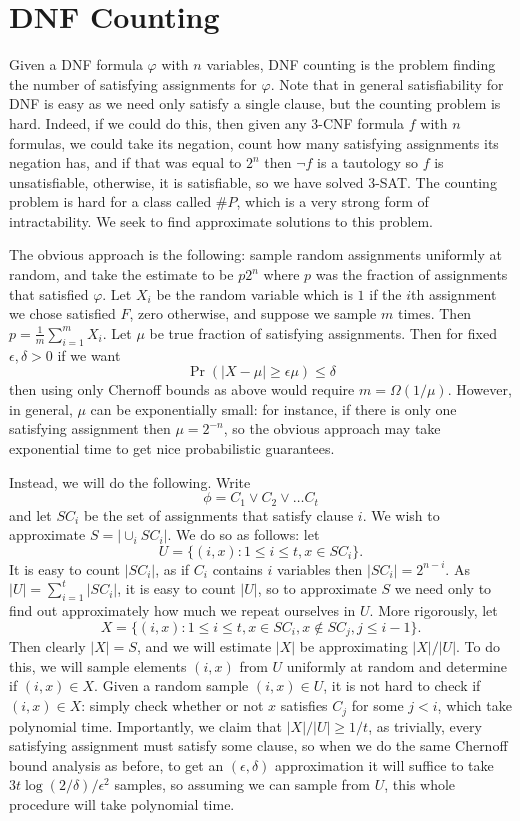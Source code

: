 \section{DNF Counting}
Given a DNF formula $\varphi$ with $n$ variables, DNF counting is the problem finding the number of satisfying assignments for $\varphi$. Note that in general satisfiability for DNF is easy as we need only satisfy a single clause, but the counting problem is hard. Indeed, if we could do this, then given any 3-CNF formula $f$ with $n$ formulas, we could take its negation, count how many satisfying assignments its negation has, and if that was equal to $2^n$ then $\neg f$ is a tautology so $f$ is unsatisfiable, otherwise, it is satisfiable, so we have solved 3-SAT. The counting problem is hard for a class called $\# P$, which is a very strong form of intractability. We seek to find approximate solutions to this problem.

The obvious approach is the following: sample random assignments uniformly at random, and take the estimate to be $p 2^n$ where $p$ was the fraction of assignments that satisfied $\varphi$. Let $X_i$ be the random variable which is $1$ if the $i$th assignment we chose satisfied $F$, zero otherwise, and suppose we sample $m$ times. Then $p = \frac{1}{m} \sum_{i = 1}^m X_i$. Let $\mu$ be true fraction of satisfying assignments. Then for fixed $\epsilon, \delta > 0$ if we want
\[\Pr (|X - \mu| \geq \epsilon \mu) \leq \delta\]
then using only Chernoff bounds as above would require $m = \Omega (1 / \mu)$. However, in general, $\mu$ can be exponentially small: for instance, if there is only one satisfying assignment then $\mu = 2^{-n}$, so the obvious approach may take exponential time to get nice probabilistic guarantees.

Instead, we will do the following. Write
\[\phi = C_1 \vee C_2 \vee \ldots C_t\]
and let $SC_i$ be the set of assignments that satisfy clause $i$. We wish to approximate $S = |\cup_i SC_i|$. We do so as follows: let
\[U = \{(i, x): 1 \leq i \leq t, x \in SC_i\}.\]
It is easy to count $|SC_i|$, as if $C_i$ contains $i$ variables then $|SC_i| = 2^{n - i}$. As $|U| = \sum_{i = 1}^t |SC_i|$, it is easy to count $|U|$, so to approximate $S$ we need only to find out approximately how much we repeat ourselves in $U$. More rigorously, let
\[X = \{(i, x): 1 \leq i \leq t, x \in SC_i, x \not\in SC_j, j \leq i - 1\}.\]
Then clearly $|X| = S$, and we will estimate $|X|$ be approximating $|X| / |U|$. To do this, we will sample elements $(i, x)$ from $U$ uniformly at random and determine if $(i, x) \in X$. Given a random sample $(i, x) \in U$, it is not hard to check if $(i, x) \in X$: simply check whether or not $x$ satisfies $C_j$ for some $j < i$, which take polynomial time. Importantly, we claim that $|X| / |U| \geq 1 / t$, as trivially, every satisfying assignment must satisfy some clause, so when we do the same Chernoff bound analysis as before, to get an $(\epsilon, \delta)$ approximation it will suffice to take $3 t \log (2 / \delta) / \epsilon^2$ samples, so assuming we can sample from $U$, this whole procedure will take polynomial time.

